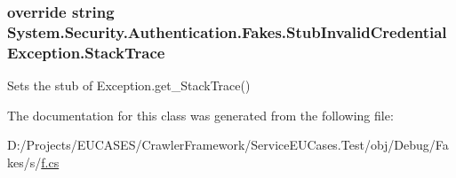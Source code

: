 \hypertarget{class_system_1_1_security_1_1_authentication_1_1_fakes_1_1_stub_invalid_credential_exception_aef73f1951833e5e1b53154815ba9e201}{
\subsubsection[{Stack\-Trace}]{\setlength{\rightskip}{0pt plus 5cm}override string System.\-Security.\-Authentication.\-Fakes.\-Stub\-Invalid\-Credential\-Exception.\-Stack\-Trace\hspace{0.3cm}{\ttfamily [get]}}}\label{class_system_1_1_security_1_1_authentication_1_1_fakes_1_1_stub_invalid_credential_exception_aef73f1951833e5e1b53154815ba9e201}


Sets the stub of Exception.\-get\-\_\-\-Stack\-Trace()



The documentation for this class was generated from the following file\-:\begin{DoxyCompactItemize}
\item 
D\-:/\-Projects/\-E\-U\-C\-A\-S\-E\-S/\-Crawler\-Framework/\-Service\-E\-U\-Cases.\-Test/obj/\-Debug/\-Fakes/s/\hyperlink{s_2f_8cs}{f.\-cs}\end{DoxyCompactItemize}
